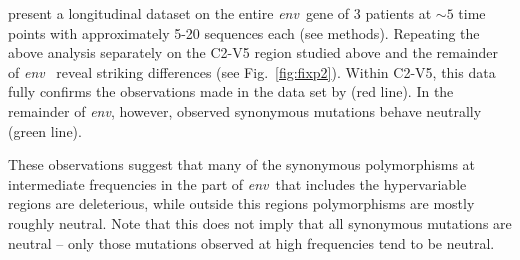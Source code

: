 \documentclass[rmp, twocolumn]{revtex4}
\newcommand{\FIG}[1]{Fig.~\ref{fig:#1}}
\newcommand{\env}{\textit{env}}
\begin{document}
\citet{bunnik_autologous_2008} present a longitudinal dataset on the entire
\env~gene of 3 patients at $\sim 5$ time points with approximately 5-20
sequences each (see methods). Repeating the above analysis separately on the
C2-V5 region studied above and the remainder of \env~ reveal striking
differences (see \FIG{fixp2}). Within C2-V5, this data fully confirms the
observations made in the data set by \citet{shankarappa_consistent_1999} (red
line). In the remainder of \env, however, observed synonymous mutations behave
neutrally (green line). 

These observations suggest that many of the synonymous polymorphisms at
intermediate frequencies in the part of \env~that includes the hypervariable
regions are deleterious, while outside this regions polymorphisms are mostly
roughly neutral. Note that this does not imply that all synonymous mutations are
neutral -- only those mutations observed at high frequencies tend to be neutral.
\end{document}
